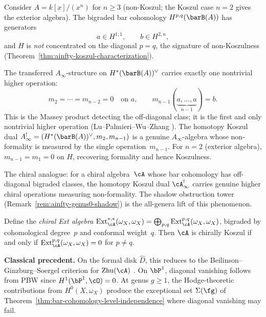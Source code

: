 \begin{example}
\label{ex:truncated-polynomial-ainfty}

Consider $A = k[x]/(x^n)$ for $n \geq 3$ (non-Koszul; the Koszul
case $n = 2$ gives the exterior algebra). The bigraded bar
cohomology $H^{p,q}(\barB(A))$ has generators
\[
a \in H^{1,1}, \qquad b \in H^{2,n},
\]
and $H$ is \emph{not} concentrated on the diagonal $p = q$,
the signature of non-Koszulness
(Theorem~\ref{thm:ainfty-koszul-characterization}).

The transferred $A_\infty$-structure on $H^*(\barB(A))^\vee$
carries exactly one nontrivial higher operation:
\[
m_2 = \cdots = m_{n-2} = 0 \quad \text{on } a,
\qquad
m_{n-1}(\underbrace{a, \ldots, a}_{n-1}) = b.
\]
This is the Massey product detecting the off-diagonal class; it is
the first and only nontrivial higher operation
(Lu--Palmieri--Wu--Zhang \cite{LPWZ09}). The homotopy Koszul dual
$A^!_\infty = (H^*(\barB(A))^\vee, m_2, m_{n-1})$ is a genuine
$A_\infty$-algebra whose non-formality is measured by the single
operation~$m_{n-1}$. For $n = 2$ (exterior algebra), $m_{n-1} = m_1
= 0$ on $H$, recovering formality and hence Koszulness.

The chiral analogue: for a chiral algebra~$\cA$ whose bar
cohomology has off-diagonal bigraded classes, the homotopy Koszul
dual $\cA^!_\infty$ carries genuine higher chiral operations
measuring non-formality. The shadow obstruction tower
(Remark~\ref{rem:ainfty-genus0-shadow}) is the all-genera lift of
this phenomenon.
\end{example}

\begin{theorem}
\label{thm:ext-diagonal-vanishing}%

Define the \emph{chiral Ext algebra}
$\operatorname{Ext}^{*,*}_\cA(\omega_X, \omega_X)
= \bigoplus_{p,q} \operatorname{Ext}^{p,q}_\cA(\omega_X, \omega_X)$,
bigraded by cohomological degree~$p$ and conformal weight~$q$.
Then $\cA$ is chirally Koszul if and only if
$\operatorname{Ext}^{p,q}_\cA(\omega_X, \omega_X) = 0$ for $p \neq q$.

\smallskip\noindent\textbf{Classical precedent.}
On the formal disk $\hat{D}$, this reduces to the
Beilinson--Ginzburg--Soergel criterion for $\operatorname{Zhu}(\cA)$
\cite{BGS96}.
On $\bP^1$, diagonal vanishing follows from PBW since
$H^1(\bP^1, \cO) = 0$.
At genus $g \geq 1$, the Hodge-theoretic contributions from
$H^0(X, \omega_X)$ produce the exceptional set $\Sigma(\fg)$ of
Theorem~\ref{thm:bar-cohomology-level-independence} where diagonal
vanishing may fail.

\end{theorem}

